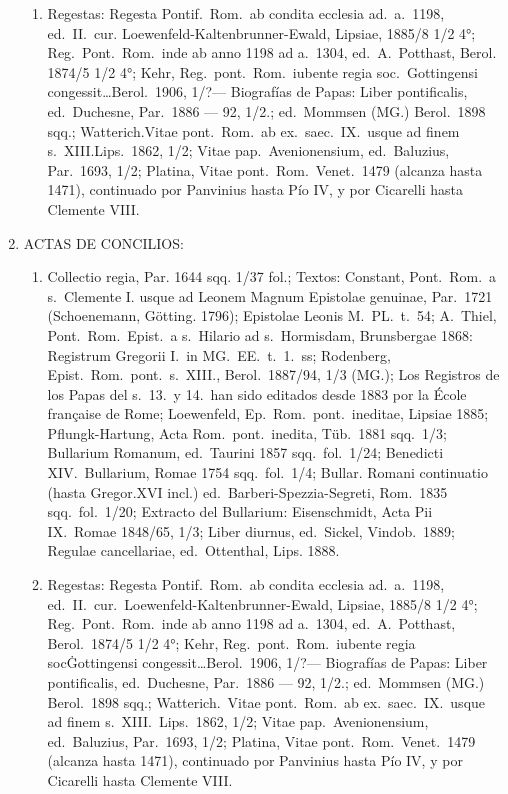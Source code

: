 \raggedbottom{} \documentclass[12pt, a4paper, openany]{book} %
\begin{document}
\begin{enumerate}
\begin{enumerate}
          \item Regestas: Regesta Pontif.\ Rom.\ ab condita ecclesia ad.\ a.\ 1198, ed.\ II.\ cur. Loewenfeld-Kaltenbrunner-Ewald, Lipsiae, 1885/8 1/2 4°; Reg.\ Pont.\ Rom.\ inde ab anno 1198 ad a.\ 1304, ed.\ A.\ Potthast, Berol. 1874/5 1/2 4°; Kehr, Reg.\ pont.\ Rom.\ iubente regia soc.\ Gottingensi congessit\ldots Berol.\ 1906, 1/?— Biografías de Papas: Liber pontificalis, ed.\ Duchesne, Par.\ 1886 --- 92, 1/2.; ed.\ Mommsen (MG.) Berol.\ 1898 sqq.; Watterich.\@ Vitae pont.\ Rom.\ ab ex.\ saec.\ IX.\ usque ad finem s.\ XIII.\@ Lips.\ 1862, 1/2; Vitae pap.\ Avenionensium, ed.\ Baluzius, Par.\ 1693, 1/2; Platina, Vitae pont.\ Rom.\ Venet.\ 1479 (alcanza hasta 1471), continuado por Panvinius hasta Pío IV, y por Cicarelli hasta Clemente VIII.\@
        \end{enumerate}
  \item ACTAS DE CONCILIOS:\@  \begin{enumerate}
          \item Collectio regia, Par. 1644 sqq. 1/37 fol.; Textos: Constant, Pont.\ Rom.\ a s.\ Clemente I. usque ad Leonem Magnum Epistolae genuinae, Par.\ 1721 (Schoenemann, Götting. 1796); Epistolae Leonis M.\ PL.\ t.\ 54; A.\ Thiel, Pont.\ Rom.\ Epist.\ a s.\ Hilario ad s.\ Hormisdam, Brunsbergae 1868: Registrum Gregorii I.\ in MG.\ EE.\ t.\ 1.\ ss; Rodenberg, Epist.\ Rom.\ pont.\ s.\ XIII., Berol.\ 1887/94, 1/3 (MG.); Los Registros de los Papas del s.\ 13.\ y 14.\ han sido editados desde 1883 por la École française de Rome; Loewenfeld, Ep.\ Rom.\ pont.\ ineditae, Lipsiae 1885; Pflungk-Hartung, Acta Rom.\ pont.\ inedita, Tüb.\ 1881 sqq.\ 1/3; Bullarium Romanum, ed.\ Taurini 1857 sqq.\ fol.\ 1/24; Benedicti XIV.\ Bullarium, Romae 1754 sqq.\ fol.\ 1/4; Bullar. Romani continuatio (hasta Gregor.\@ XVI incl.) ed.\ Barberi-Spezzia-Segreti, Rom.\ 1835 sqq.\ fol.\ 1/20; Extracto del Bullarium: Eisenschmidt, Acta Pii IX.\ Romae 1848/65, 1/3; Liber diurnus, ed.\ Sickel, Vindob.\ 1889; Regulae cancellariae, ed.\ Ottenthal, Lips. 1888.
          \item Regestas: Regesta Pontif.\ Rom.\ ab condita ecclesia ad.\ a.\ 1198, ed.\ II.\ cur.\ Loewenfeld-Kaltenbrunner-Ewald, Lipsiae, 1885/8 1/2 4°; Reg.\ Pont.\ Rom.\ inde ab anno 1198 ad a.\ 1304, ed.\ A.\ Potthast, Berol.\ 1874/5 1/2 4°; Kehr, Reg.\ pont.\ Rom.\ iubente regia soc\. Gottingensi congessit\ldots Berol.\ 1906, 1/?— Biografías de Papas: Liber pontificalis, ed.\ Duchesne, Par.\ 1886 --- 92, 1/2.; ed.\ Mommsen (MG.) Berol.\ 1898 sqq.; Watterich.\ Vitae pont.\ Rom.\ ab ex.\ saec.\ IX.\ usque ad finem s.\ XIII.\ Lips.\ 1862, 1/2; Vitae pap.\ Avenionensium, ed.\ Baluzius, Par.\ 1693, 1/2; Platina, Vitae pont.\ Rom.\ Venet.\ 1479 (alcanza hasta 1471), continuado por Panvinius hasta Pío IV, y por Cicarelli hasta Clemente VIII.\

\end{enumerate}
\end{enumerate}
\end{document}
